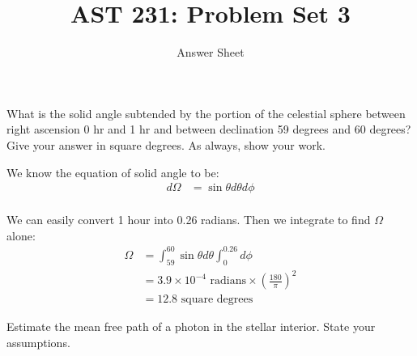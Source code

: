 \documentclass[12pt]{article}
\newenvironment{problem}[2][Problem]{\begin{trivlist}
\item[\hskip \labelsep {\bfseries #1}\hskip \labelsep {\bfseries #2.}]}{\end{trivlist}}
\newenvironment{answer}[2][Answer]{\begin{trivlist}
\item[\hskip \labelsep {\bfseries #1}\hskip \labelsep {\bfseries #2.}]}{\end{trivlist}}
\begin{document}

\title{AST 231: Problem Set 3}
\author{Answer Sheet}
\maketitle

\begin{problem}{1}
What is the solid angle subtended by the portion of the celestial sphere between right ascension 0 hr and 1 hr and between declination 59 degrees and 60 degrees? Give your answer in square degrees. As always, show your work.
\end{problem}

\begin{answer}{1}

We know the equation of solid angle to be:
\begin{align*}
  d \Omega &= \sin{\theta} d\theta d\phi \\
\end{align*}

We can easily convert 1 hour into 0.26 radians. Then we integrate to find $\Omega$ alone:
\begin{align*}
  \Omega &= \int_{59} ^{60} \sin{\theta} d\theta \int_{0} ^{0.26} d\phi \\
         &= 3.9 \times 10^{-4} \text{ radians} \times (\frac{180}{\pi})^2 \\
         &= 12.8 \text{ square degrees}
\end{align*}





\end{answer}





\begin{problem}{2}

Estimate the mean free path of a photon in the stellar interior. State your assumptions.

\end{problem}
\end{document}

